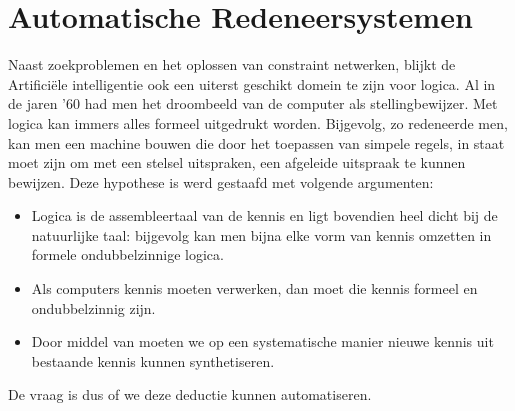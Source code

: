 \section{Automatische Redeneersystemen}
\label{s:automaticReasoning}
Naast zoekproblemen en het oplossen van constraint netwerken, blijkt de Artificiële intelligentie ook een uiterst geschikt domein te zijn voor logica. Al in de jaren '60 had men het droombeeld van de computer als stellingbewijzer. Met logica kan immers alles formeel uitgedrukt worden. Bijgevolg, zo redeneerde men, kan men een machine bouwen die door het toepassen van simpele regels, in staat moet zijn om met een stelsel uitspraken, een afgeleide uitspraak te kunnen bewijzen. Deze hypothese is werd gestaafd met volgende argumenten:
\begin{itemize}
 \item Logica is de assembleertaal van de kennis en ligt bovendien heel dicht bij de natuurlijke taal: bijgevolg kan men bijna elke vorm van kennis omzetten in formele ondubbelzinnige logica.
 \item Als computers kennis moeten verwerken, dan moet die kennis formeel en ondubbelzinnig zijn.
 \item Door middel van  moeten we op een systematische manier nieuwe kennis uit bestaande kennis kunnen synthetiseren.
\end{itemize}
De vraag is dus of we deze deductie kunnen automatiseren.
